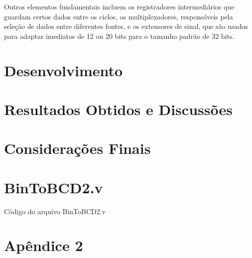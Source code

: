 \documentclass[
	12pt,				%
	openright,			%
	a4paper,			%
	english,			%
	french,				%
	spanish,			%
	brazil,				%
	]{abntex2}
\begin{document}
Outros elementos fundamentais incluem os registradores intermediários que guardam certos dados entre os ciclos,
os multiplexadores, responsáveis pela seleção de dados entre diferentes fontes, e os extensores de sinal, 
que são usados para adaptar imediatos de 12 ou 20 bits para o tamanho padrão de 32 bits. 
\chapter{Desenvolvimento}


\chapter{Resultados Obtidos e Discussões}


\chapter{Considerações Finais}





\postextual





\begin{apendicesenv}

\partapendices

\chapter{BinToBCD2.v}
\label{code:BinToBCD2.v}
Código do arquivo BinToBCD2.v
 

\chapter{Apêndice 2}


\end{apendicesenv}
\end{document}
